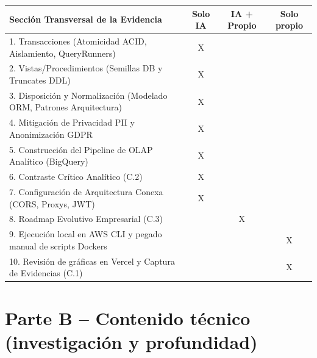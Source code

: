 \documentclass[12pt,a4paper]{article}
\begin{document}
\begin{table}[h]
\centering
\begin{tabularx}{\textwidth}{|X|c|c|c|}
\hline
\textbf{Sección Transversal de la Evidencia} & \textbf{Solo IA} & \textbf{IA + Propio} & \textbf{Solo propio} \\ \hline
1. Transacciones (Atomicidad ACID, Aislamiento, QueryRunners) & X & & \\ \hline
2. Vistas/Procedimientos (Semillas DB y Truncates DDL) & X & & \\ \hline
3. Disposición y Normalización (Modelado ORM, Patrones Arquitectura) & X & & \\ \hline
4. Mitigación de Privacidad PII y Anonimización GDPR & X & & \\ \hline
5. Construcción del Pipeline de OLAP Analítico (BigQuery) & X & & \\ \hline
6. Contraste Crítico Analítico (C.2) & X & & \\ \hline
7. Configuración de Arquitectura Conexa (CORS, Proxys, JWT) & X & & \\ \hline
8. Roadmap Evolutivo Empresarial (C.3) & & X & \\ \hline
9. Ejecución local en AWS CLI y pegado manual de scripts Dockers & & & X \\ \hline
10. Revisión de gráficas en Vercel y Captura de Evidencias (C.1) & & & X \\ \hline
\end{tabularx}
\end{table}

\newpage
\section{Parte B – Contenido técnico (investigación y profundidad)}
\end{document}
